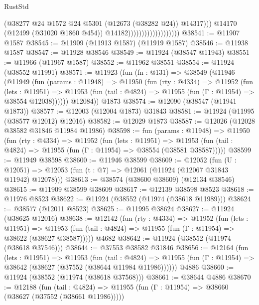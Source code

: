 \begin{lexlean}{RustStd}
\begin{coremodule}
                                              (@38277
                                                @24
                                                @1572
                                                @24
                                                @5301
                                                (@12673 (@38282 @24))
                                                @14317)))
                                          @14170
                                          (@12499 (@31020 @1860 @454))
                                          @14182)))))))))))))))))))
@38541 := @11907 @1587
@38545 := @11909 (@11913 @1587) (@11919 @1587)
@38546 := @11938 @1587
@38547 := @11928 @38546
@38549 := @11924 (@38547 @11943)
@38551 := @11966 (@11967 @1587)
@38552 := @11962 @38551
@38554 := @11924 (@38552 @11991)
@38571 := @11923
    (fun (fn : @131) =>
    @38549
      (@11946
        (@11949
          (fun (params : @11948) =>
          @11950
            (fun (rty : @4334) =>
            @11952
              (fun (lets : @11951) =>
              @11953 (fun (tail : @4824) => @11955 (fun (Γ : @11954) => @38554 @12038))))))
        @12084))
    @1873
@38574 := @12090 (@38547 (@11941 @1873))
@38577 := @12003 (@12004 @1873) @31843
@38581 := @11924 (@11995 (@38577 @12012) @12016)
@38582 := @12029 @1873
@38587 := @12026 (@12028 @38582 @31846 @11984 @11986)
@38598 := fun (params : @11948) =>
  @11950
    (fun (rty : @4334) =>
    @11952
      (fun (lets : @11951) =>
      @11953 (fun (tail : @4824) => @11955 (fun (Γ : @11954) => @38554 (@38581 @38587)))))
@38599 := @11949 @38598
@38600 := @11946 @38599
@38609 := @12052
    (fun (U : @12051) => @12053 (fun (t : @7) => @12061 (@11924 (@12067 @31843 @11942) @12078)))
@38613 := @38574 (@38600 @38609) (@12134 @38546)
@38615 := @11909 @38599 @38609
@38617 := @12139 @38598 @8523
@38618 := @11976 @8523
@38622 := @11924 (@38552 (@11974 (@38618 @11989)))
@38624 := @38577 (@12011 @8523)
@38625 := @11995 @38624
@38627 := @11924 (@38625 @12016)
@38638 := @12142
    (fun (rty : @4334) =>
    @11952
      (fun (lets : @11951) =>
      @11953 (fun (tail : @4824) => @11955 (fun (Γ : @11954) => @38622 (@38627 @38587)))))
    @4682
@38642 := @11924 (@38552 (@11974 (@38618 @37546)))
@38644 := @37553 @38582 @31846
@38656 := @12164
    (fun (lets : @11951) =>
    @11953
      (fun (tail : @4824) =>
      @11955 (fun (Γ : @11954) => @38642 (@38627 (@37552 (@38644 @11984 @11986))))))
    @4886
@38660 := @11924 (@38552 (@11974 (@38618 @37568)))
@38661 := @38644 @4886
@38670 := @12188
    (fun (tail : @4824) => @11955 (fun (Γ : @11954) => @38660 (@38627 (@37552 (@38661 @11986)))))

\end{coremodule}
\end{lexlean}
